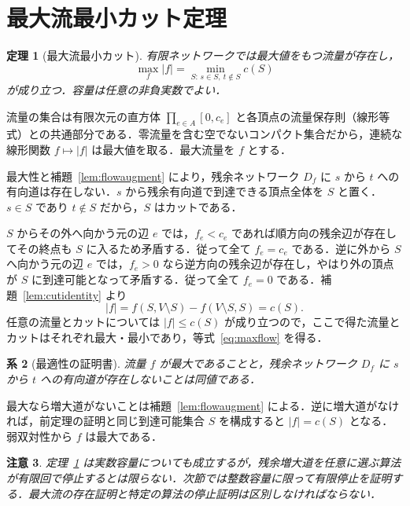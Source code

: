 \documentclass[a5paper,10pt,onecolumn]{jsarticle}
\makeatletter
\theoremstyle{mathnotetheorem}
\newtheorem{theorem}{定理}[section]
\newtheorem{corollary}[theorem]{系}
\newtheorem{remark}[theorem]{注意}
\renewcommand{\proofname}{証明}
\renewenvironment{proof}[1][\proofname]{%
  \par\pushQED{\qed}\normalfont\topsep4\p@\@plus2\p@\relax
  \trivlist\item[\hskip\labelsep\bfseries #1]\ignorespaces
}{\popQED\endtrivlist\@endpefalse}
\makeatother
\begin{document}
\section{最大流最小カット定理}
\begin{theorem}[最大流最小カット]\label{thm:maxflow}
有限ネットワークでは最大値をもつ流量が存在し，
\[
 \max_f |f|=\min_{S:\,s\in S,\ t\notin S}c(S)
 \tag{2}\label{eq:maxflow}
\]
が成り立つ．容量は任意の非負実数でよい．
\end{theorem}
\begin{proof}
流量の集合は有限次元の直方体 $\prod_{e\in A}[0,c_e]$ と各頂点の流量保存則（線形等式）との共通部分である．零流量を含む空でないコンパクト集合だから，連続な線形関数 $f\mapsto|f|$ は最大値を取る．最大流量を $f$ とする．

最大性と補題~\ref{lem:flowaugment} により，残余ネットワーク $D_f$ に $s$ から $t$ への有向道は存在しない．$s$ から残余有向道で到達できる頂点全体を $S$ と置く．$s\in S$ であり $t\notin S$ だから，$S$ はカットである．

$S$ からその外へ向かう元の辺 $e$ では，$f_e<c_e$ であれば順方向の残余辺が存在してその終点も $S$ に入るため矛盾する．従って全て $f_e=c_e$ である．逆に外から $S$ へ向かう元の辺 $e$ では，$f_e>0$ なら逆方向の残余辺が存在し，やはり外の頂点が $S$ に到達可能となって矛盾する．従って全て $f_e=0$ である．補題~\ref{lem:cutidentity} より
\[
 |f|=f(S,V\setminus S)-f(V\setminus S,S)=c(S).
\]
任意の流量とカットについては $|f|\le c(S)$ が成り立つので，ここで得た流量とカットはそれぞれ最大・最小であり，等式~\eqref{eq:maxflow} を得る．
\end{proof}

\begin{corollary}[最適性の証明書]
流量 $f$ が最大であることと，残余ネットワーク $D_f$ に $s$ から $t$ への有向道が存在しないことは同値である．
\end{corollary}
\begin{proof}
最大なら増大道がないことは補題~\ref{lem:flowaugment} による．逆に増大道がなければ，前定理の証明と同じ到達可能集合 $S$ を構成すると $|f|=c(S)$ となる．弱双対性から $f$ は最大である．
\end{proof}

\begin{remark}
定理~\ref{thm:maxflow} は実数容量についても成立するが，残余増大道を任意に選ぶ算法が有限回で停止するとは限らない．次節では整数容量に限って有限停止を証明する．最大流の存在証明と特定の算法の停止証明は区別しなければならない．
\end{remark}
\end{document}
